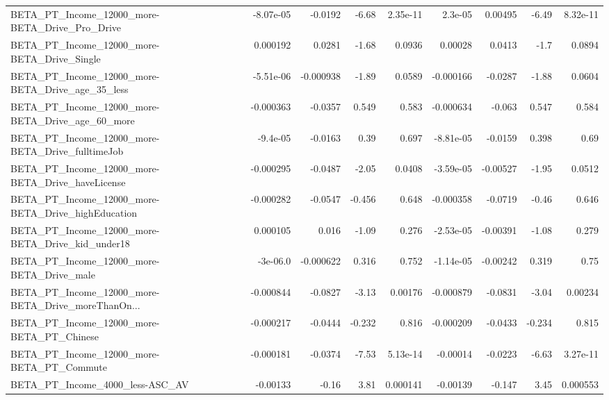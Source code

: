 \begin{tabular}{lrrrrrrrr}
BETA\_PT\_Income\_12000\_more-BETA\_Drive\_Pro\_Drive     &   -8.07e-05 &      -0.0192 &     -6.68 & 2.35e-11 &    2.3e-05 &     0.00495 &        -6.49 &      8.32e-11 \\
BETA\_PT\_Income\_12000\_more-BETA\_Drive\_Single        &    0.000192 &       0.0281 &     -1.68 &   0.0936 &    0.00028 &      0.0413 &         -1.7 &        0.0894 \\
BETA\_PT\_Income\_12000\_more-BETA\_Drive\_age\_35\_less   &   -5.51e-06 &    -0.000938 &     -1.89 &   0.0589 &  -0.000166 &     -0.0287 &        -1.88 &        0.0604 \\
BETA\_PT\_Income\_12000\_more-BETA\_Drive\_age\_60\_more   &   -0.000363 &      -0.0357 &     0.549 &    0.583 &  -0.000634 &      -0.063 &        0.547 &         0.584 \\
BETA\_PT\_Income\_12000\_more-BETA\_Drive\_fulltimeJob   &    -9.4e-05 &      -0.0163 &      0.39 &    0.697 &  -8.81e-05 &     -0.0159 &        0.398 &          0.69 \\
BETA\_PT\_Income\_12000\_more-BETA\_Drive\_haveLicense   &   -0.000295 &      -0.0487 &     -2.05 &   0.0408 &  -3.59e-05 &    -0.00527 &        -1.95 &        0.0512 \\
BETA\_PT\_Income\_12000\_more-BETA\_Drive\_highEducation &   -0.000282 &      -0.0547 &    -0.456 &    0.648 &  -0.000358 &     -0.0719 &        -0.46 &         0.646 \\
BETA\_PT\_Income\_12000\_more-BETA\_Drive\_kid\_under18   &    0.000105 &        0.016 &     -1.09 &    0.276 &  -2.53e-05 &    -0.00391 &        -1.08 &         0.279 \\
BETA\_PT\_Income\_12000\_more-BETA\_Drive\_male          &    -3e-06.0 &    -0.000622 &     0.316 &    0.752 &  -1.14e-05 &    -0.00242 &        0.319 &          0.75 \\
BETA\_PT\_Income\_12000\_more-BETA\_Drive\_moreThanOn... &   -0.000844 &      -0.0827 &     -3.13 &  0.00176 &  -0.000879 &     -0.0831 &        -3.04 &       0.00234 \\
BETA\_PT\_Income\_12000\_more-BETA\_PT\_Chinese          &   -0.000217 &      -0.0444 &    -0.232 &    0.816 &  -0.000209 &     -0.0433 &       -0.234 &         0.815 \\
BETA\_PT\_Income\_12000\_more-BETA\_PT\_Commute          &   -0.000181 &      -0.0374 &     -7.53 & 5.13e-14 &   -0.00014 &     -0.0223 &        -6.63 &      3.27e-11 \\
BETA\_PT\_Income\_4000\_less-ASC\_AV                    &    -0.00133 &        -0.16 &      3.81 & 0.000141 &   -0.00139 &      -0.147 &         3.45 &      0.000553 \\

\end{tabular}
